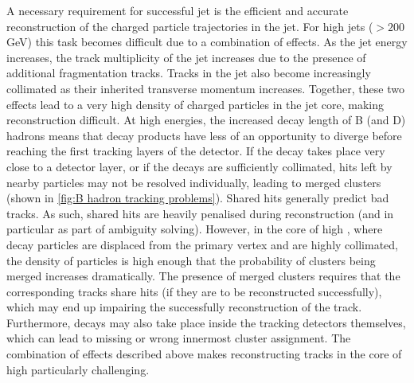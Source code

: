 A necessary requirement for successful jet \btagging is the efficient and accurate reconstruction of the charged particle trajectories in the jet. For high \pT jets (\pT $> 200$ GeV) this task becomes difficult due to a combination of effects. As the jet energy increases, the track multiplicity of the jet increases due to the presence of additional fragmentation tracks. Tracks in the jet also become increasingly collimated as their inherited transverse momentum increases. Together, these two effects lead to a very high density of charged particles in the jet core, making reconstruction difficult. At high energies, the increased decay length of B (and D) hadrons means that decay products have less of an opportunity to diverge before reaching the first tracking layers of the detector. If the decay takes place very close to a detector layer, or if the decays are sufficiently collimated, hits left by nearby particles may not be resolved individually, leading to merged clusters (shown in \cref{fig:B hadron tracking problems}). Shared hits generally predict bad tracks. As such, shared hits are heavily penalised during reconstruction (and in particular as part of ambiguity solving). However, in the core of high \pT \bjets, where decay particles are displaced from the primary vertex and are highly collimated, the density of particles is high enough that the probability of clusters being merged increases dramatically. The presence of merged clusters requires that the corresponding tracks share hits (if they are to be reconstructed successfully), which may end up impairing the successfully reconstruction of the track. Furthermore, decays may also take place inside the tracking detectors themselves, which can lead to missing or wrong innermost cluster assignment. The combination of effects described above makes reconstructing tracks in the core of high \pT \bjets particularly challenging.


